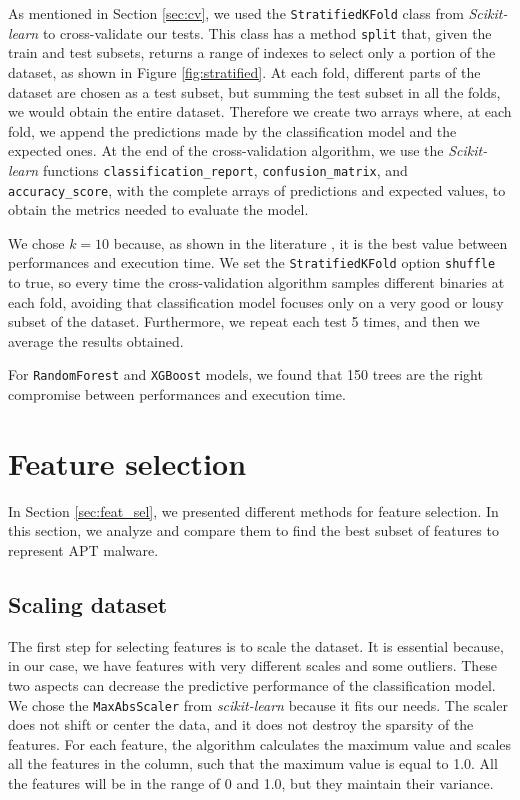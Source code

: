 As mentioned in Section \ref{sec:cv}, we used the \texttt{StratifiedKFold} class from \textit{Scikit-learn} to cross-validate our tests. This class has a method \texttt{split} that, given the train and test subsets, returns a range of indexes to select only a portion of the dataset, as shown in Figure \ref{fig:stratified}.  At each fold, different parts of the dataset are chosen as a test subset, but summing the test subset in all the folds, we would obtain the entire dataset. Therefore we create two arrays where, at each fold, we append the predictions made by the classification model and the expected ones. At the end of the cross-validation algorithm, we use the \textit{Scikit-learn} functions \texttt{classification\_report}, \texttt{confusion\_matrix}, and \texttt{accuracy\_score}, with the complete arrays of predictions and expected values, to obtain the metrics needed to evaluate the model.

We chose $k = 10$ because, as shown in the literature \cite{kohavi1995study}, it is the best value between performances and execution time. 
We set the \texttt{StratifiedKFold} option \texttt{shuffle} to true, so every time the cross-validation algorithm samples different binaries at each fold, avoiding that classification model focuses only on a very good or lousy subset of the dataset. Furthermore, we repeat each test 5 times, and then we average the results obtained.

For \texttt{RandomForest} and \texttt{XGBoost} models, we found that 150 trees are the right compromise between performances and execution time.

\section{Feature selection}
In Section \ref{sec:feat_sel}, we presented different methods for feature selection. In this section, we analyze and compare them to find the best subset of features to represent APT malware.

\subsection{Scaling dataset}
The first step for selecting features is to scale the dataset. It is essential because, in our case, we have features with very different scales and some outliers. These two aspects can decrease the predictive performance of the classification model. We chose the \texttt{MaxAbsScaler} from \textit{scikit-learn} because it fits our needs. The scaler does not shift or center the data, and it does not destroy the sparsity of the features. For each feature, the algorithm calculates the maximum value and scales all the features in the column, such that the maximum value is equal to 1.0. All the features will be in the range of 0 and 1.0, but they maintain their variance.

